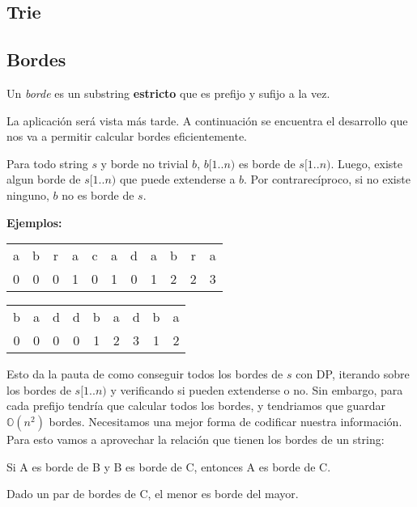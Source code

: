 
\subsection{Trie}



\subsection{Bordes}

Un \textit{borde} es un substring \textbf{estricto} que es prefijo y sufijo a la vez.

La aplicación será vista más tarde. A continuación se encuentra el desarrollo que nos va a permitir calcular bordes eficientemente.

Para todo string $s$ y borde no trivial $b$, $b[1..n)$ es borde de $s[1..n)$. Luego, existe algun borde de $s[1..n)$ que puede extenderse a $b$. Por contrarecíproco, si no existe ninguno, $b$ no es borde de $s$.


\textbf{Ejemplos:}

\begin{tabular}{ccccccccccc}
    a & b & r & a & c & a & d & a & b & r & a \\
    0 & 0 & 0 & 1 & 0 & 1 & 0 & 1 & 2 & 2 & 3
\end{tabular}

\begin{tabular}{ccccccccc}
    b & a & d & d & b & a & d & b & a \\
    0 & 0 & 0 & 0 & 1 & 2 & 3 & 1 & 2
\end{tabular}
 
Esto da la pauta de como conseguir todos los bordes de $s$ con DP, iterando sobre los bordes de $s[1..n)$ y verificando si pueden extenderse o no. Sin embargo, para cada prefijo tendría que calcular todos los bordes, y tendriamos que guardar $\mathds{O}(n^2)$ bordes. Necesitamos una mejor forma de codificar nuestra información. Para esto vamos a aprovechar la relación que tienen los bordes de un string:

\begin{lema}
    Si A es borde de B y B es borde de C, entonces A es borde de C.
\end{lema}

\begin{lema}
    Dado un par de bordes de C, el menor es borde del mayor.
\end{lema}

